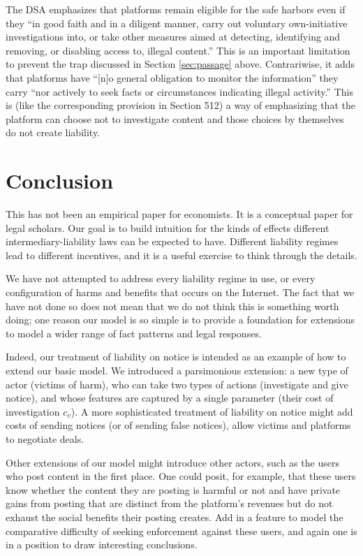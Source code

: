 The DSA emphasizes that platforms remain eligible for the safe harbors even if they ``in good faith and in a diligent manner, carry out voluntary own-initiative investigations into, or take other measures aimed at detecting, identifying and removing, or disabling access to, illegal content.'' This is an important limitation to prevent the  trap discussed in Section \ref{sec:passage} above. Contrariwise, it adds that platforms have ``[n]o general obligation to monitor the information'' they carry ``nor actively to seek facts or circumstances indicating illegal activity.'' This is (like the corresponding provision in Section 512) a way of emphasizing that the platform can choose not to investigate content and those choices by themselves do not create liability.


\section{Conclusion}

This has not been an empirical paper for economists. It is a conceptual paper for legal scholars. Our goal is to build intuition for the kinds of effects different intermediary-liability laws can be expected to have. Different liability regimes lead to different incentives, and it is a useful exercise to think through the details.

We have not attempted to address every liability regime in use, or every configuration of harms and benefits that occurs on the Internet. The fact that we have not done so does not mean that we do not think this is something worth doing; one reason our model is so simple is to provide a foundation for extensions to model a wider range of fact patterns and legal responses. 

Indeed, our treatment of liability on notice is intended as an example of how to extend our basic model. We introduced a parsimonious extension: a new type of actor (victims of harm), who can take two types of actions (investigate and give notice), and whose features are captured by a single parameter (their cost of investigation $c_v$). A more sophisticated treatment of liability on notice might add costs of sending notices (or of sending false notices), allow victims and platforms to negotiate deals.

Other extensions of our model might introduce other actors, such as the users who post content in the first place. One could posit, for example, that these users know whether the content they are posting is harmful or not and have private gains from posting that are distinct from the platform's revenues but do not exhaust the social benefits their posting creates. Add in a feature to model the comparative difficulty of seeking enforcement against these users, and again one is in a position to draw interesting conclusions.

